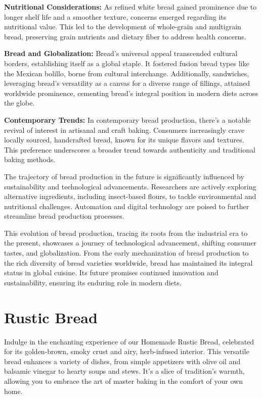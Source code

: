 \textbf{Nutritional Considerations:} As refined white bread gained prominence due to longer shelf life and a smoother texture, concerns emerged regarding its nutritional value. This led to the development of whole-grain and multigrain bread, preserving grain nutrients and dietary fiber to address health concerns.

\textbf{Bread and Globalization:} Bread's universal appeal transcended cultural borders, establishing itself as a global staple. It fostered fusion bread types like the Mexican bolillo, borne from cultural interchange. Additionally, sandwiches, leveraging bread's versatility as a canvas for a diverse range of fillings, attained worldwide prominence, cementing bread's integral position in modern diets across the globe.

\textbf{Contemporary Trends:} In contemporary bread production, there's a notable revival of interest in artisanal and craft baking. Consumers increasingly crave locally sourced, handcrafted bread, known for its unique flavors and textures. This preference underscores a broader trend towards authenticity and traditional baking methods.

The trajectory of bread production in the future is significantly influenced by sustainability and technological advancements. Researchers are actively exploring alternative ingredients, including insect-based flours, to tackle environmental and nutritional challenges. Automation and digital technology are poised to further streamline bread production processes.

This evolution of bread production, tracing its roots from the industrial era to the present, showcases a journey of technological advancement, shifting consumer tastes, and globalization. From the early mechanization of bread production to the rich diversity of bread varieties worldwide, bread has maintained its integral status in global cuisine. Its future promises continued innovation and sustainability, ensuring its enduring role in modern diets.

\section{Rustic Bread}
\label{rusticbread}
Indulge in the enchanting experience of our Homemade Rustic Bread, celebrated for its golden-brown, smoky crust and airy, herb-infused interior. This versatile bread enhances a variety of dishes, from simple appetizers with olive oil and balsamic vinegar to hearty soups and stews. It's a slice of tradition's warmth, allowing you to embrace the art of master baking in the comfort of your own home.

